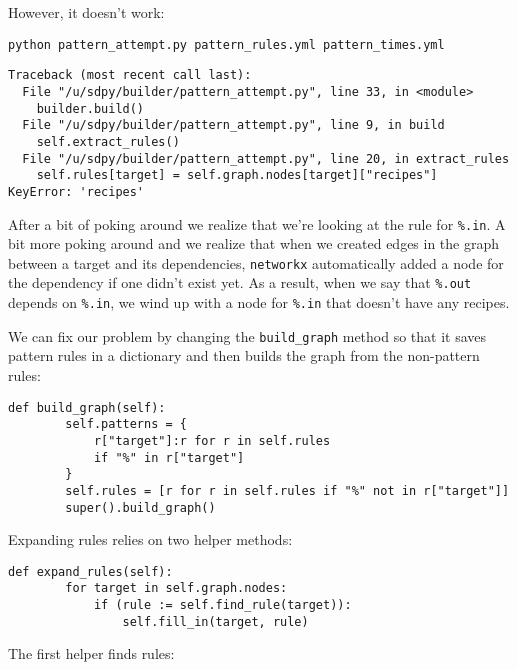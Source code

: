 \documentclass{scrbook}
\begin{document}
However,
it doesn't work:


\begin{lstlisting}[frame=single,frameround=tttt]
python pattern_attempt.py pattern_rules.yml pattern_times.yml
\end{lstlisting}



\begin{lstlisting}[frame=single,frameround=tttt]
Traceback (most recent call last):
  File "/u/sdpy/builder/pattern_attempt.py", line 33, in <module>
    builder.build()
  File "/u/sdpy/builder/pattern_attempt.py", line 9, in build
    self.extract_rules()
  File "/u/sdpy/builder/pattern_attempt.py", line 20, in extract_rules
    self.rules[target] = self.graph.nodes[target]["recipes"]
KeyError: 'recipes'
\end{lstlisting}



After a bit of poking around we realize that
we're looking at the rule for \texttt{\%.in}.
A bit more poking around and we realize that
when we created edges in the graph between a target and its dependencies,
\texttt{networkx} automatically added a node for the dependency
if one didn't exist yet.
As a result,
when we say that \texttt{\%.out} depends on \texttt{\%.in},
we wind up with a node for \texttt{\%.in} that doesn't have any recipes.


We can fix our problem by changing the \texttt{build\_graph} method
so that it saves pattern rules in a dictionary
and then builds the graph from the non-pattern rules:


\begin{lstlisting}[frame=single,frameround=tttt]
    def build_graph(self):
        self.patterns = {
            r["target"]:r for r in self.rules
            if "%" in r["target"]
        }
        self.rules = [r for r in self.rules if "%" not in r["target"]]
        super().build_graph()
\end{lstlisting}



Expanding rules relies on two helper methods:


\begin{lstlisting}[frame=single,frameround=tttt]
    def expand_rules(self):
        for target in self.graph.nodes:
            if (rule := self.find_rule(target)):
                self.fill_in(target, rule)
\end{lstlisting}



The first helper finds rules:
\end{document}
